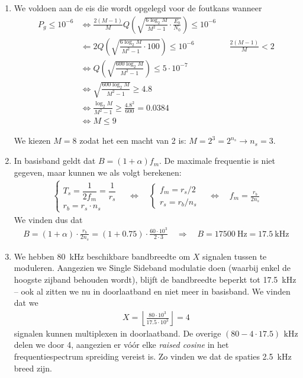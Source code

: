 \documentclass{kuburgiearticle}
\begin{document}
	\begin{enumerate}
		\item	We voldoen aan de eis die wordt opgelegd voor de foutkans wanneer \begin{align*}
			P_g \leq 10^{-6} & \Longleftrightarrow \frac{2(M-1)}{M} Q \left( \sqrt{\frac{6 \log_2 M}{M^2 - 1} \cdot \frac{E_b}{N_0}} \right) \leq 10^{-6} \\
			& \Longleftarrow 2 Q \left( \sqrt{\frac{6 \log_2 M}{M^2 - 1} \cdot 100} \right) \leq 10^{-6} && \frac{2(M-1)}{M} < 2 \\
			& \Longleftrightarrow Q \left( \sqrt{\frac{600 \log_2 M}{M^2 - 1}} \right) \leq 5 \cdot 10^{-7} \\
			& \Longleftrightarrow \sqrt{\frac{600 \log_2 M}{M^2 - 1}} \geq 4.8  \\
			& \Longleftrightarrow \frac{\log_2 M}{M^2 - 1} \geq \frac{4.8^2}{600} = 0.0384 \\
			& \Longleftrightarrow M \leq 9
		\end{align*}

		We kiezen \(M=8\) zodat het een macht van 2 is: \(M=2^3 = 2^{n_s} \rightarrow n_s=3\).

		\item In basisband geldt dat \(B = (1 + \alpha)f_m\). De maximale frequentie is niet gegeven, maar kunnen we als volgt berekenen: \begin{align*}
			\left\{ \begin{array}{l}
				T_s = \dfrac{1}{2f_m} = \dfrac{1}{r_s} \\
				r_b = r_s \cdot n_s
			\end{array} \right. \quad \Longleftrightarrow \quad \left\{ \begin{array}{l}
			f_m = r_s/2 \\
			r_s = r_b/n_s
			\end{array} \right. \quad \Longleftrightarrow \quad f_m = \frac{r_b}{2n_s}
		\end{align*}
		We vinden dus dat \begin{align*}
			B = (1+\alpha)\cdot\frac{r_b}{2n_s} = (1+0.75)\cdot\frac{60 \cdot 10^3}{2 \cdot 3} \quad \Longrightarrow \quad B = \SI{17500}{\hertz} =  \SI{17.5}{\kilo\hertz}
		\end{align*}

		\item We hebben \SI{80}{\kilo\hertz} beschikbare bandbreedte om \(X\) signalen tussen te moduleren. Aangezien we Single Sideband modulatie doen (waarbij enkel de hoogste zijband behouden wordt), blijft de bandbreedte beperkt tot \SI{17.5}{\kilo\hertz} -- ook al zitten we nu in doorlaatband en niet meer in basisband. We vinden dat we \begin{align*}
			X = \left\lfloor \frac{80 \cdot 10^3}{17.5 \cdot 10^3} \right\rfloor = 4
		\end{align*} signalen kunnen multiplexen in doorlaatband. De overige \((80 - 4 \cdot 17.5) \, \SI{}{\kilo\hertz}\) delen we door 4, aangezien er vóór elke \textit{raised cosine} in het frequentiespectrum spreiding vereist is. Zo vinden we dat de spaties \SI{2.5}{\kilo\hertz} breed zijn.


\end{enumerate}
\end{document}
